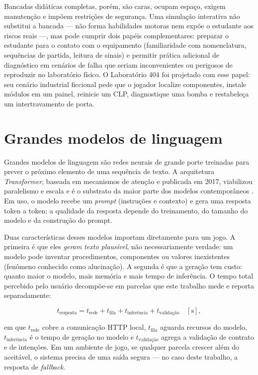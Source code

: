Bancadas didáticas completas, porém, são caras, ocupam espaço, exigem
manutenção e impõem restrições de segurança. Uma simulação interativa não
substitui a bancada --- não forma habilidades motoras nem expõe o estudante
aos riscos reais ---, mas pode cumprir dois papéis complementares: preparar o
estudante para o contato com o equipamento (familiaridade com nomenclatura,
sequências de partida, leitura de sinais) e permitir prática adicional de
diagnóstico em cenários de falha que seriam inconvenientes ou perigosos de
reproduzir no laboratório físico. O Laboratório 404 foi projetado com esse
papel: seu cenário industrial ficcional pede que o jogador localize
componentes, instale módulos em um painel, reinicie um CLP, diagnostique uma
bomba e restabeleça um intertravamento de porta.

\section{Grandes modelos de linguagem}
\label{sec:llm}

Grandes modelos de linguagem são redes neurais de grande porte treinadas para
prever o próximo elemento de uma sequência de texto. A arquitetura
\emph{Transformer}, baseada em mecanismos de atenção e publicada em 2017,
viabilizou paralelismo e escala e é o substrato da maior parte dos modelos
contemporâneos \cite{vaswani2017attention}. Em uso, o modelo recebe um
\emph{prompt} (instruções e contexto) e gera uma resposta token a token; a
qualidade da resposta depende do treinamento, do tamanho do modelo e da
construção do prompt.

Duas características desses modelos importam diretamente para um jogo. A
primeira é que eles \emph{geram texto plausível}, não necessariamente verdade:
um modelo pode inventar procedimentos, componentes ou valores inexistentes
(fenômeno conhecido como alucinação). A segunda é que a geração tem custo:
quanto maior o modelo, mais memória e mais tempo de inferência. O tempo total
percebido pelo usuário decompõe-se em parcelas que este trabalho mede e
reporta separadamente:

\begin{equation}
\label{eq:latencia}
t_{\text{resposta}} = t_{\text{rede}} + t_{\text{fila}} + t_{\text{inferência}} + t_{\text{validação}} \quad [\text{s}],
\end{equation}

\noindent em que $t_{\text{rede}}$ cobre a comunicação HTTP local,
$t_{\text{fila}}$ aguarda recursos do modelo, $t_{\text{inferência}}$ é o
tempo de geração no modelo e $t_{\text{validação}}$ agrega a validação de
contrato e de intenções. Em um ambiente de jogo, se qualquer parcela crescer
além do aceitável, o sistema precisa de uma saída segura --- no caso deste
trabalho, a resposta de \emph{fallback}.

